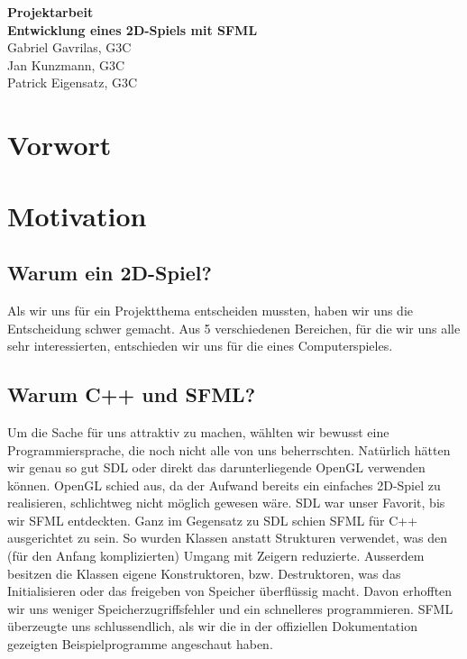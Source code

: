\documentclass[12pt,a4paper]{scrartcl}
\begin{document}
\begin{titlepage}
\begin{center}

\vspace*{3cm}
\textbf{\huge{Projektarbeit}}\\
\vspace*{2cm}
\textbf{\large{Entwicklung eines 2D-Spiels mit SFML}}\\
\vspace*{5cm}
Gabriel Gavrilas, G3C\\
Jan Kunzmann, G3C\\
Patrick Eigensatz, G3C
\end{center}
\end{titlepage}




\newpage

\setcounter{page}{1}
\section*{Vorwort}
\blindtext[1]

\newpage


\tableofcontents

\newpage


\section{Motivation}
\subsection{Warum ein 2D-Spiel?}
Als wir uns für ein Projektthema entscheiden mussten, haben
wir uns die Entscheidung schwer gemacht. Aus 5 verschiedenen
Bereichen, für die wir uns alle sehr interessierten, entschieden wir uns für die
eines Computerspieles.

\subsection{Warum C++ und SFML?}
Um die Sache für uns attraktiv zu machen,
wählten wir bewusst eine Programmiersprache, die noch nicht
alle von uns beherrschten. Natürlich hätten wir genau so gut
SDL oder direkt das darunterliegende OpenGL verwenden können. OpenGL
schied aus, da der Aufwand bereits ein einfaches 2D-Spiel zu realisieren,
schlichtweg nicht möglich gewesen wäre. SDL war unser Favorit, bis wir
SFML entdeckten. Ganz im Gegensatz zu SDL schien SFML für C++ ausgerichtet
zu sein. So wurden Klassen anstatt Strukturen verwendet, was den (für den
Anfang komplizierten) Umgang mit Zeigern reduzierte. Ausserdem besitzen die
Klassen eigene Konstruktoren, bzw. Destruktoren, was das Initialisieren
oder das freigeben von Speicher überflüssig macht. Davon erhofften wir uns
weniger Speicherzugriffsfehler und ein schnelleres programmieren. SFML
überzeugte uns schlussendlich, als wir die in der offiziellen Dokumentation
gezeigten Beispielprogramme angeschaut haben.
\end{document}
